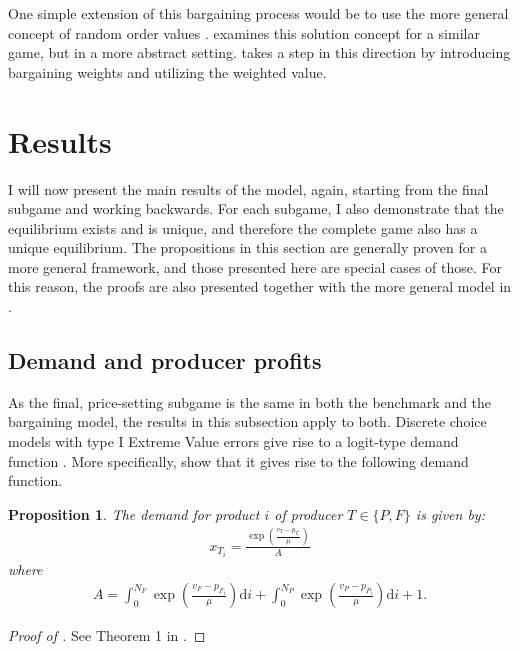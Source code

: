 \documentclass[a4paper]{article}
\newtheorem{proposition}{Proposition}
\newcommand{\di}{\mathrm{d}i}
\begin{document}
One simple extension of this bargaining process would be to use the more general concept of random order values \parencite{weber1988probabilistic}.
\textcite{stancsics2023value} examines this solution concept for a similar game, but in a more abstract setting.
 takes a step in this direction by introducing bargaining weights and utilizing the weighted value.

\section{Results}
\label{sec:results}

I will now present the main results of the model, again, starting from the final subgame and working backwards.
For each subgame, I also demonstrate that the equilibrium exists and is unique, and therefore the complete game also has a unique equilibrium.
The propositions in this section are generally proven for a more general framework, and those presented here are special cases of those.
For this reason, the proofs are also presented together with the more general model in .

\subsection{Demand and producer profits}
\label{sec:results_demand}

As the final, price-setting subgame is the same in both the benchmark and the bargaining model, the results in this subsection apply to both.
Discrete choice models with type I Extreme Value errors give rise to a logit-type demand function \parencite[e.g.][]{small1981applied}.
More specifically, \textcite[]{anderson2021hybrid} show that it gives rise to the following demand function.
\begin{proposition}
    \label{prop:demand_function}
    The demand for product $i$ of producer $T \in \{P, F\}$ is given by:
    \begin{align*}
        x_{T_i} = \frac{\exp\left( \frac{v_T - p_{T_i}}{\mu} \right)}{A}
    \end{align*}
    where
    \begin{align}
        A = \int_0^{N_F} \exp\left( \frac{v_F - p_{F_i}}{\mu} \right) \di + \int_0^{N_P} \exp\left( \frac{v_P - p_{P_i}}{\mu} \right) \di + 1.
        \label{eq:aggregate}
    \end{align}
\end{proposition}
\begin{proof}[Proof of ]
    See Theorem 1 in \textcite{anderson2021hybrid}.
\end{proof}
\end{document}
